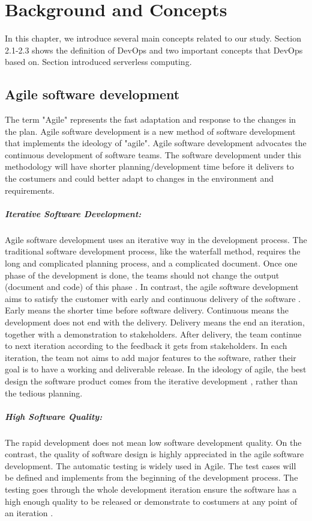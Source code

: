 \chapter{Background and Concepts}
In this chapter, we introduce several main concepts related to our study. Section 2.1-2.3 shows the definition of DevOps and two important concepts that DevOps based on. Section introduced serverless computing.
\section{Agile software development}
\label{agile}
The term "Agile" represents the fast adaptation and response to the changes in the plan\cite{highsmith2002agile}.
Agile software development is a new method of software development that implements the ideology of "agile". Agile software development advocates the continuous development of software teams. The software development under this methodology will have shorter planning/development time before it delivers to the costumers and could better adapt to changes in the environment and requirements.
\paragraph{Iterative Software Development:} Agile software development uses an iterative way in the development process. The traditional software development process, like the waterfall method, requires the long and complicated planning process, and a complicated document. Once one phase of the development is done, the teams should not change the output (document and code) of this phase \cite{cusumano1995beyond}. In contrast, the agile software development aims to satisfy the customer with early and continuous delivery of the software \cite{beck2001manifesto}. Early means the shorter time before software delivery. Continuous means the development does not end with the delivery. Delivery means the end an iteration, together with a demonstration to stakeholders. After delivery, the team continue to next iteration according to the feedback it gets from stakeholders. In each iteration, the team not aims to add major features to the software, rather their goal \cite{beck1999embracing} is to have a working and deliverable release. In the ideology of agile, the best design the software product comes from the iterative development \cite{beck2001manifesto}, rather than the tedious planning.
\paragraph{High Software Quality:} The rapid development does not mean low software development quality. On the contrast, the quality of software design is highly appreciated in the agile software development. The automatic testing is widely used in Agile. The test cases will be defined and implements from the beginning of the development process. The testing goes through the whole development iteration ensure the software has a high enough quality to be released or demonstrate to costumers at any point of an iteration \cite{Agilesof32:online}.
